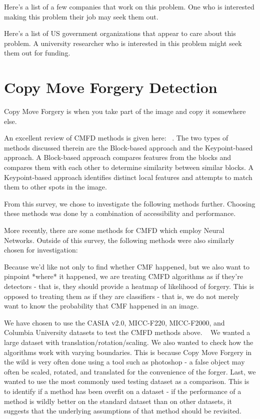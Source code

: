 \documentclass[compsoc]{IEEEtran}
\begin{document}
Here's a list of a few companies that work on this problem. One who is interested making this problem their job may seek them out.

Here's a list of US government organizations that appear to care about this problem. A university researcher who is interested in this problem might seek them out for funding. 

\section{Copy Move Forgery Detection}
Copy Move Forgery is when you take part of the image and copy it somewhere else.

An excellent review of CMFD methods is given here: ~\cite{WARIF2016259}.
The two types of methods discussed therein are the Block-based approach and the Keypoint-based approach.
A Block-based approach compares features from the blocks and compares them with each other to determine similarity between similar blocks.
A Keypoint-based approach identifies distinct local features and attempts to match them to other spots in the image. 

From this survey, we chose to investigate the following methods further. Choosing these methods was done by a combination of accessibility and performance. 

More recently, there are some methods for CMFD which employ Neural Networks. Outside of this survey, the following methods were also similarly chosen for investigation:

Because we'd like not only to find whether CMF happened, but we also want to pinpoint *where* it happened, we are treating CMFD algorithms as if they're detectors - that is, they should provide a heatmap of likelihood of forgery. This is opposed to treating them as if they are classifiers - that is, we do not merely want to know the probability that CMF happened in an image.  

We have chosen to use the CASIA v2.0, MICC-F220, MICC-F2000, and Columbia University datasets to test the CMFD methods above. ~\cite{WARIF2016259} 
We wanted a large dataset with translation/rotation/scaling.
We also wanted to check how the algorithms work with varying boundaries.
This is because Copy Move Forgery in the wild is very often done using a tool such as photoshop - a false object may often be scaled, rotated, and translated for the convenience of the forger.
Last, we wanted to use the most commonly used testing dataset as a comparison. This is to identify if a method has been overfit on a dataset - if the performance of a method is wildly better on the standard dataset than on other datasets, it suggests that the underlying assumptions of that method should be revisited.
\end{document}
